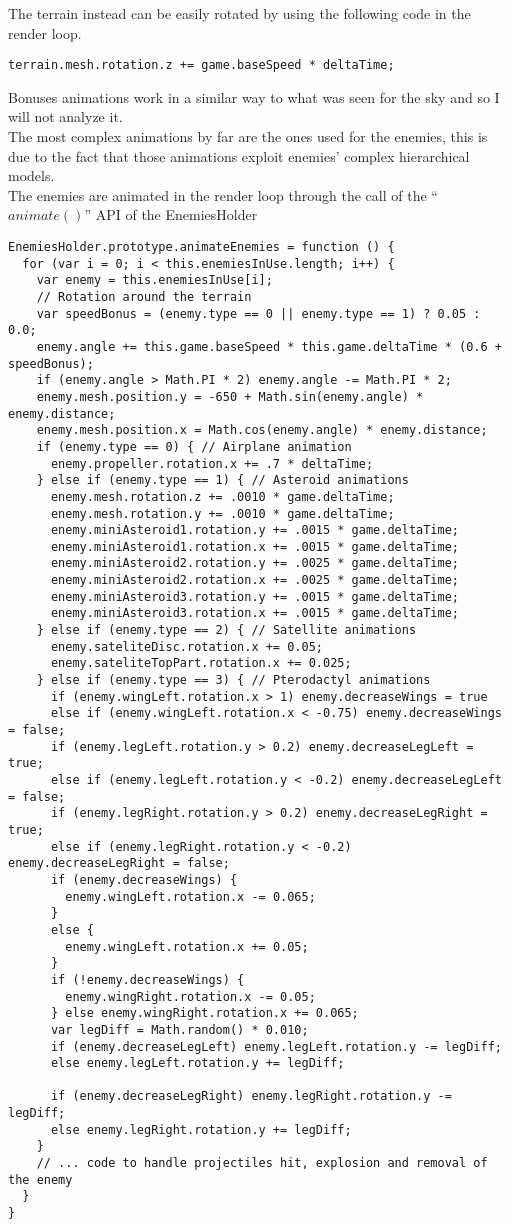 \documentclass[a4paper,11pt]{article}
\begin{document}
The terrain instead can be easily rotated by using the following code in the render loop. 
\begin{verbatim}
terrain.mesh.rotation.z += game.baseSpeed * deltaTime;
\end{verbatim}
Bonuses animations work in a similar way to what was seen for the sky and so I will not analyze it.\\
The most complex animations by far are the ones used for the enemies, this is due to the fact that those animations exploit enemies' complex hierarchical models.\\
The enemies are animated in the render loop through the call of the ``$animate()$'' API of the EnemiesHolder
\begin{verbatim}
EnemiesHolder.prototype.animateEnemies = function () {
  for (var i = 0; i < this.enemiesInUse.length; i++) {
    var enemy = this.enemiesInUse[i];
    // Rotation around the terrain
    var speedBonus = (enemy.type == 0 || enemy.type == 1) ? 0.05 : 0.0;
    enemy.angle += this.game.baseSpeed * this.game.deltaTime * (0.6 + speedBonus);
    if (enemy.angle > Math.PI * 2) enemy.angle -= Math.PI * 2;
    enemy.mesh.position.y = -650 + Math.sin(enemy.angle) * enemy.distance;
    enemy.mesh.position.x = Math.cos(enemy.angle) * enemy.distance;
    if (enemy.type == 0) { // Airplane animation
      enemy.propeller.rotation.x += .7 * deltaTime;
    } else if (enemy.type == 1) { // Asteroid animations
      enemy.mesh.rotation.z += .0010 * game.deltaTime;
      enemy.mesh.rotation.y += .0010 * game.deltaTime;
      enemy.miniAsteroid1.rotation.y += .0015 * game.deltaTime;
      enemy.miniAsteroid1.rotation.x += .0015 * game.deltaTime;
      enemy.miniAsteroid2.rotation.y += .0025 * game.deltaTime;
      enemy.miniAsteroid2.rotation.x += .0025 * game.deltaTime;
      enemy.miniAsteroid3.rotation.y += .0015 * game.deltaTime;
      enemy.miniAsteroid3.rotation.x += .0015 * game.deltaTime;
    } else if (enemy.type == 2) { // Satellite animations
      enemy.sateliteDisc.rotation.x += 0.05;
      enemy.sateliteTopPart.rotation.x += 0.025;
    } else if (enemy.type == 3) { // Pterodactyl animations
      if (enemy.wingLeft.rotation.x > 1) enemy.decreaseWings = true
      else if (enemy.wingLeft.rotation.x < -0.75) enemy.decreaseWings = false;
      if (enemy.legLeft.rotation.y > 0.2) enemy.decreaseLegLeft = true;
      else if (enemy.legLeft.rotation.y < -0.2) enemy.decreaseLegLeft = false;
      if (enemy.legRight.rotation.y > 0.2) enemy.decreaseLegRight = true;
      else if (enemy.legRight.rotation.y < -0.2) enemy.decreaseLegRight = false;
      if (enemy.decreaseWings) {
        enemy.wingLeft.rotation.x -= 0.065;
      }
      else {
        enemy.wingLeft.rotation.x += 0.05;
      }
      if (!enemy.decreaseWings) {
        enemy.wingRight.rotation.x -= 0.05;
      } else enemy.wingRight.rotation.x += 0.065;
      var legDiff = Math.random() * 0.010;
      if (enemy.decreaseLegLeft) enemy.legLeft.rotation.y -= legDiff;
      else enemy.legLeft.rotation.y += legDiff;

      if (enemy.decreaseLegRight) enemy.legRight.rotation.y -= legDiff;
      else enemy.legRight.rotation.y += legDiff;
    }
    // ... code to handle projectiles hit, explosion and removal of the enemy
  }
}
\end{verbatim}{}
\end{document}
